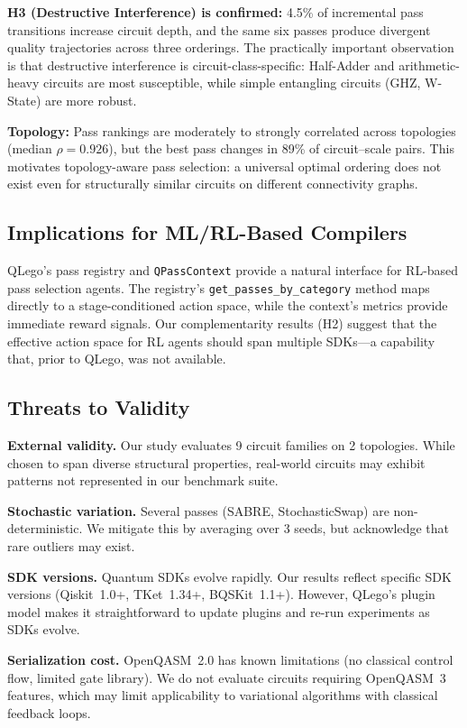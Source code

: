 \documentclass[conference]{IEEEtran}
\begin{document}
\textbf{H3 (Destructive Interference) is confirmed:}
4.5\% of incremental pass transitions increase circuit depth, and the same six passes produce divergent quality trajectories across three orderings.
The practically important observation is that destructive interference is circuit-class-specific: Half-Adder and arithmetic-heavy circuits are most susceptible, while simple entangling circuits (GHZ, W-State) are more robust.

\textbf{Topology:}
Pass rankings are moderately to strongly correlated across topologies (median $\rho = 0.926$), but the best pass changes in 89\% of circuit--scale pairs.
This motivates topology-aware pass selection: a universal optimal ordering does not exist even for structurally similar circuits on different connectivity graphs.

\subsection{Implications for ML/RL-Based Compilers}

QLego's pass registry and \texttt{QPassContext} provide a natural interface for RL-based pass selection agents.
The registry's \texttt{get\_passes\_by\_category} method maps directly to a stage-conditioned action space, while the context's metrics provide immediate reward signals.
Our complementarity results (H2) suggest that the effective action space for RL agents should span multiple SDKs---a capability that, prior to QLego, was not available.

\subsection{Threats to Validity}

\textbf{External validity.}
Our study evaluates 9 circuit families on 2 topologies.
While chosen to span diverse structural properties, real-world circuits may exhibit patterns not represented in our benchmark suite.

\textbf{Stochastic variation.}
Several passes (SABRE, StochasticSwap) are non-deterministic.
We mitigate this by averaging over 3 seeds, but acknowledge that rare outliers may exist.

\textbf{SDK versions.}
Quantum SDKs evolve rapidly.
Our results reflect specific SDK versions (Qiskit~1.0+, TKet~1.34+, BQSKit~1.1+).
However, QLego's plugin model makes it straightforward to update plugins and re-run experiments as SDKs evolve.

\textbf{Serialization cost.}
OpenQASM~2.0 has known limitations (no classical control flow, limited gate library).
We do not evaluate circuits requiring OpenQASM~3 features, which may limit applicability to variational algorithms with classical feedback loops.
\end{document}
